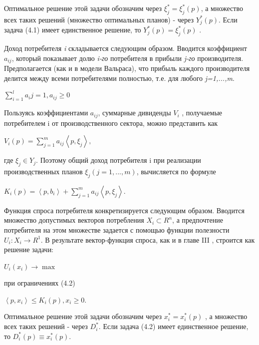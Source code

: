 \documentclass[12pt, 4paper]{book}
\begin{document}
{Оптимальное решение этой задачи обозначим через $\xi_{j}^{*} = \xi_{j}^{*}(p)$, а множество всех таких решений (множество оптимальных планов) - через $Y_{j}^{*}(p)$. Если задача (4.1) имеет единственное решение, то $Y_{j}^{*}(p) = \xi_{j}^{*}(p)$ .
\par

Доход потребителя \textit{i} складывается следующим образом. Вводится коэффициент $a_{ij}$, который показывает долю \textit{i-го} потребителя в прибыли \textit{j-го} производителя. Предполагается (как и в модели Вальраса), что прибыль каждого производителя делится между всеми потребителями полностью, т.е. для любого \textit{j=1,...,m}.
\begin{center}
$\sum\limits_{i=1}^{l}a_ij = 1, a_{ij} \geq 0$
\end{center}
\par

Пользуясь коэффициентами $a_{ij}$, суммарные дивиденды $V_i$ , получаемые потребителем i от производственного сектора, можно представить как
\begin{center}
$V_i(p) = \sum\limits_{j=1}^{m} a_{ij} \left\langle  p,\xi_j \right\rangle,$
\end{center}
где $\xi_{j} \in Y_j$. Поэтому общий доход потребителя i при реализации производственных планов $\xi_j (j=1,...,m)$, вычисляется по формуле 
\begin{center}
$K_{i}(p)=\left\langle p,b_i \right\rangle + \sum\limits_{j=1}^{m}a_{ij}\left\langle p,\xi_j \right\rangle$.
\end{center}
\par

Функция спроса потребителя конкретизируется следующим образом. Вводится множество допустимых векторов потребления $X_i \subset R^n$, а предпочтение потребителя на этом множестве задается с помощью функции полезности $U_i : X_i \rightarrow R^1$. В результате вектор-функция спроса, как и в главе III , строится как решение задачи:
\begin{center}
$U_i (x_i) \rightarrow \max$
\end{center}
\begin{center}
при ограничениях (4.2)
\end{center}
\begin{center}
$\left\langle  p,x_i \right\rangle \leq K_i(p),x_i \geq 0$.
\end{center}
\par

Оптимальное решение этой задачи обозначим через $x_{i}^{*}=x_{i}^{*}(p)$ , а множество всех таких решений - через $D_{i}^{*}$. Если задача (4.2) имеет единственное решение, то $D_{i}^{*}(p)\equiv x_{i}^{*}(p)$.
\par

}
\end{document}
